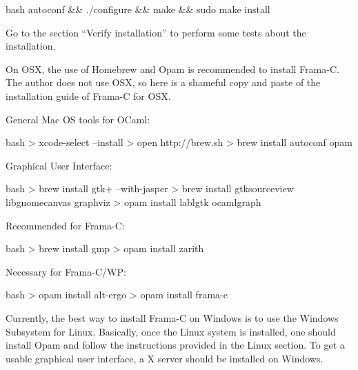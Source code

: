 \begin{CodeBlock}{bash}
autoconf && ./configure && make && sudo make install
\end{CodeBlock}



Go to the section ``Verify installation'' to perform some tests about
the installation.





On OSX, the use of Homebrew and Opam is recommended to install Frama-C.
The author does not use OSX, so here is a shameful copy and paste of the
installation guide of Frama-C for OSX.




General Mac OS tools for OCaml:



\begin{CodeBlock}{bash}
> xcode-select --install
> open http://brew.sh
> brew install autoconf opam
\end{CodeBlock}



Graphical User Interface:



\begin{CodeBlock}{bash}
> brew install gtk+ --with-jasper
> brew install gtksourceview libgnomecanvas graphviz
> opam install lablgtk ocamlgraph
\end{CodeBlock}



Recommended for Frama-C:



\begin{CodeBlock}{bash}
> brew install gmp
> opam install zarith
\end{CodeBlock}



Necessary for Frama-C/WP:



\begin{CodeBlock}{bash}
> opam install alt-ergo
> opam install frama-c
\end{CodeBlock}





Currently, the best way to install Frama-C on Windows is to use the
Windows Subsystem for Linux. Basically, once the Linux system is installed,
one should install Opam and follow the instructions provided in the Linux
section. To get a usable graphical user interface, a X server should be
installed on Windows.


